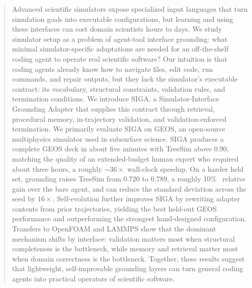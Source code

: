 \documentclass{article}
\begin{document}
\begin{abstract}
Advanced scientific simulators expose specialized input languages that turn simulation goals into executable configurations, but learning and using these interfaces can cost domain scientists hours to days. We study simulator setup as a problem of agent-tool interface grounding: what minimal simulator-specific adaptations are needed for an off-the-shelf coding agent to operate real scientific software? Our intuition is that coding agents already know how to navigate files, edit code, run commands, and repair outputs, but they lack the simulator's executable contract: its vocabulary, structural constraints, validation rules, and termination conditions. We introduce SIGA, a Simulator-Interface Grounding Adapter that supplies this contract through retrieval, procedural memory, in-trajectory validation, and validation-enforced termination. We primarily evaluate SIGA on GEOS, an open-source multiphysics simulator used in subsurface science. SIGA produces a complete GEOS deck in about five minutes with TreeSim above 0.90, matching the quality of an extended-budget human expert who required about three hours, a roughly $\sim 36\times$ wall-clock speedup. On a harder held set, grounding raises TreeSim from 0.720 to 0.789, a roughly 10\% \ relative gain over the bare agent, and can reduce the standard deviation across the seed by $16\times$. 
Self-evolution further improves SIGA by rewriting adapter contents from prior trajectories, yielding the best held-out GEOS performance and outperforming the strongest hand-designed configuration. Transfers to OpenFOAM and LAMMPS show that the dominant mechanism shifts by interface: validation matters most when structural completeness is the bottleneck, while memory and retrieval matter most when domain correctness is the bottleneck. Together, these results suggest that lightweight, self-improvable grounding layers can turn general coding agents into practical operators of scientific software.

\end{abstract}
\end{document}
